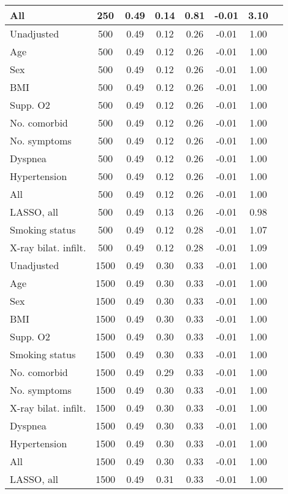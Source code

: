 \documentclass{article}
\begin{document}
{\begin{longtable}{lccccccc}
All & 250 & 0.49 & 0.14 & 0.81 & -0.01 & 3.10 \\ \midrule 
Unadjusted & 500 & 0.49 & 0.12 & 0.26 & -0.01 & 1.00 \\ 
Age & 500 & 0.49 & 0.12 & 0.26 & -0.01 & 1.00 \\ 
Sex & 500 & 0.49 & 0.12 & 0.26 & -0.01 & 1.00 \\ 
BMI & 500 & 0.49 & 0.12 & 0.26 & -0.01 & 1.00 \\ 
Supp. O2 & 500 & 0.49 & 0.12 & 0.26 & -0.01 & 1.00 \\ 
No. comorbid & 500 & 0.49 & 0.12 & 0.26 & -0.01 & 1.00 \\ 
No. symptoms & 500 & 0.49 & 0.12 & 0.26 & -0.01 & 1.00 \\ 
Dyspnea & 500 & 0.49 & 0.12 & 0.26 & -0.01 & 1.00 \\ 
Hypertension & 500 & 0.49 & 0.12 & 0.26 & -0.01 & 1.00 \\ 
All & 500 & 0.49 & 0.12 & 0.26 & -0.01 & 1.00 \\ 
LASSO, all & 500 & 0.49 & 0.13 & 0.26 & -0.01 & 0.98 \\ 
Smoking status & 500 & 0.49 & 0.12 & 0.28 & -0.01 & 1.07 \\ 
X-ray bilat. infilt. & 500 & 0.49 & 0.12 & 0.28 & -0.01 & 1.09 \\ \midrule 
Unadjusted & 1500 & 0.49 & 0.30 & 0.33 & -0.01 & 1.00 \\ 
Age & 1500 & 0.49 & 0.30 & 0.33 & -0.01 & 1.00 \\ 
Sex & 1500 & 0.49 & 0.30 & 0.33 & -0.01 & 1.00 \\ 
BMI & 1500 & 0.49 & 0.30 & 0.33 & -0.01 & 1.00 \\ 
Supp. O2 & 1500 & 0.49 & 0.30 & 0.33 & -0.01 & 1.00 \\ 
Smoking status & 1500 & 0.49 & 0.30 & 0.33 & -0.01 & 1.00 \\ 
No. comorbid & 1500 & 0.49 & 0.29 & 0.33 & -0.01 & 1.00 \\ 
No. symptoms & 1500 & 0.49 & 0.30 & 0.33 & -0.01 & 1.00 \\ 
X-ray bilat. infilt. & 1500 & 0.49 & 0.30 & 0.33 & -0.01 & 1.00 \\ 
Dyspnea & 1500 & 0.49 & 0.30 & 0.33 & -0.01 & 1.00 \\ 
Hypertension & 1500 & 0.49 & 0.30 & 0.33 & -0.01 & 1.00 \\ 
All & 1500 & 0.49 & 0.30 & 0.33 & -0.01 & 1.00 \\ 
LASSO, all & 1500 & 0.49 & 0.31 & 0.33 & -0.01 & 1.00 \\
\bottomrule
\hline
\end{longtable}
}
\end{document}
